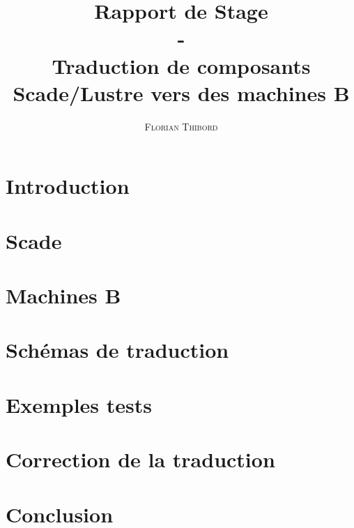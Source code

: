 \documentclass[12pt]{report}
\title{Rapport de Stage \\ - \\ Traduction de composants Scade/Lustre vers des
  machines B}
\author{\textsc{Florian Thibord}}
\begin{document}
\maketitle
\clearpage

\tableofcontents 
\newpage

\chapter{Introduction}


\chapter{Scade}


\chapter {Machines B}


\chapter{Schémas de traduction}


\chapter{Exemples tests}


\chapter{Correction de la traduction}

\chapter{Conclusion}

\end{document}
